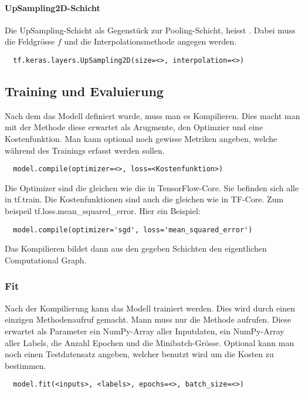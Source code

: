 \paragraph{UpSampling2D-Schicht}
Die UpSampling-Schicht als Gegenstück zur Pooling-Schicht, heisst
. Dabei muss die Feldgrösse $f$ und die
Interpolationsmethode angegen werden.

\begin{verbatim}
  tf.keras.layers.UpSampling2D(size=<>, interpolation=<>)
\end{verbatim}

\subsection{Training und Evaluierung}

Nach dem das Modell definiert wurde, muss man es Kompilieren.
Dies macht man mit der Methode  diese erwartet als
Arugmente, den Optimzier und eine Kostenfunktion. Man kann optional noch gewisse
Metriken angeben, welche während des Trainings erfasst werden sollen.
\begin{verbatim}
  model.compile(optimizer=<>, loss=<Kostenfunktion>)
\end{verbatim}
Die Optimizer sind die gleichen wie die in TensorFlow-Core. Sie befinden sich
alle in tf.train. Die Kostenfunktionen sind auch die gleichen wie in TF-Core.
Zum beispeil tf.loss.mean\_squared\_error.
\para{}
Hier ein Beispiel:
\begin{verbatim}
  model.compile(optimizer='sgd', loss='mean_squared_error')
\end{verbatim}
Das Kompilieren bildet dann aus den gegeben Schichten den eigentlichen
Computational Graph.

\subsubsection{Fit}
Nach der Kompilierung kann das Modell trainiert werden. Dies wird durch einen
einzigen Methodenaufruf gemacht. Mann muss nur die  Methode aufrufen.
Diese erwartet als Parameter ein NumPy-Array aller Inputdaten, ein NumPy-Array
aller Labels, die Anzahl Epochen und die Minibatch-Grösse.
Optional kann man noch einen Testdatensatz angeben, welcher benutzt wird um die
Kosten zu bestimmen.
\begin{verbatim}
  model.fit(<inputs>, <labels>, epochs=<>, batch_size=<>)
\end{verbatim}

